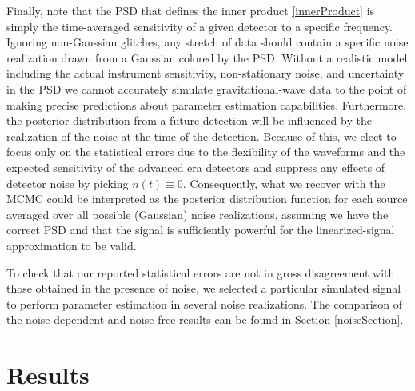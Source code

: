 \documentclass[11pt,a4paper]{emulateapj} 
\begin{document}
Finally, note that the PSD that defines the inner
product \eqref{innerProduct} is simply the time-averaged sensitivity
of a given detector to a specific frequency.  Ignoring non-Gaussian
glitches, any stretch of data should contain a specific noise
realization drawn from a Gaussian colored by the PSD.  Without a
realistic model including the actual instrument sensitivity, non-stationary
 noise, and uncertainty in the PSD we cannot accurately
simulate gravitational-wave data to the point of making precise predictions about
parameter estimation capabilities.  Furthermore, the posterior
distribution from a future detection will be influenced by the
realization of the noise at the time of the detection.  Because of
this, we elect to focus only on the statistical errors due to the
flexibility of the waveforms and the expected sensitivity of the
advanced era detectors and suppress any effects of detector noise by
picking $n(t) \equiv 0$.
Consequently, what we recover with the MCMC could be interpreted as
the posterior distribution function for each source averaged over all
possible (Gaussian) noise realizations, assuming we have the correct
PSD and that the signal is sufficiently powerful for the linearized-signal
approximation \citep{Vallisneri} to be valid.

To check that our reported statistical errors are not in gross
disagreement with those obtained in the presence of noise, we selected
a particular simulated signal to perform parameter estimation in
several noise realizations.  The comparison of the noise-dependent and
noise-free results can be found in Section \ref{noiseSection}.

\section{Results}
\label{resultsSection} 
\end{document}

